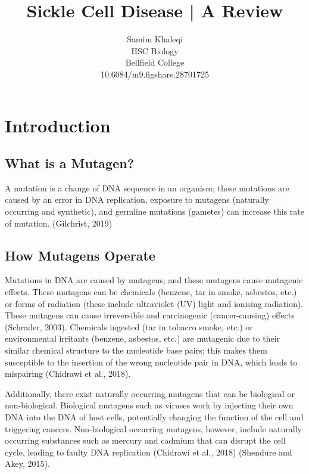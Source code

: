 \documentclass{mva_style}
\begin{document}
\title{Sickle Cell Disease | A Review}

\author{
  Samim Khaleqi\\
  HSC Biology\\
  Bellfield College\\
  10.6084/m9.figshare.28701725
}

\maketitle


\section{Introduction}
\subsection{What is a Mutagen?}
A mutation is a change of DNA sequence in an organism; these mutations are caused by an error in DNA replication, exposure to mutagens (naturally occurring and synthetic), and germline mutations (gametes) can increase this rate of mutation. (Gilchrist, 2019)

\subsection{How Mutagens Operate}
Mutations in DNA are caused by mutagens, and these mutagens cause mutagenic effects. These mutagens can be chemicals (benzene, tar in smoke, asbestos, etc.) or forms of radiation (these include ultraviolet (UV) light and ionising radiation). These mutagens can cause irreversible and carcinogenic (cancer-causing) effects (Schrader, 2003).
Chemicals ingested (tar in tobacco smoke, etc.) or environmental irritants (benzene, asbestos, etc.) are mutagenic due to their similar chemical structure to the nucleotide base pairs; this makes them susceptible to the insertion of the wrong nucleotide pair in DNA, which leads to mispairing (Chidrawi et al., 2018).

Additionally, there exist naturally occurring mutagens that can be biological or non-biological. Biological mutagens such as viruses work by injecting their own DNA into the DNA of host cells, potentially changing the function of the cell and triggering cancers. Non-biological occurring mutagens, however, include naturally occurring substances such as mercury and cadmium that can disrupt the cell cycle, leading to faulty DNA replication (Chidrawi et al., 2018) (Shendure and Akey, 2015).
\end{document}
